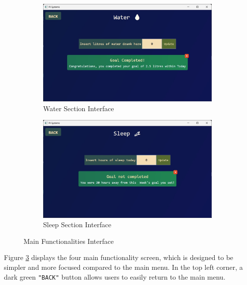 \documentclass[11pt]{article}
\begin{document}
\begin{figure}[!ht]
  \begin{subfigure}{0.4\linewidth}
    \includegraphics[width = \linewidth]{Water Screen}
    \caption{Water Section Interface}
    \label{fig:Water}
  \end{subfigure}%
  \hfill
  \begin{subfigure}{0.4\linewidth}
    \includegraphics[width = \linewidth]{Sleep Screen}
    \caption{Sleep Section Interface}
    \label{fig:Sleep}
  \end{subfigure}

  \caption{Main Functionalities Interface}
  \label{fig:Main}
\end{figure}



Figure \ref{fig:Main} displays the four main functionality screen, which is designed
to be simpler and more focused compared to the main menu. In the top left corner, a 
dark green \texttt{"BACK"} button allows users to easily return to the main menu.\par 

\newpage
\end{document}
